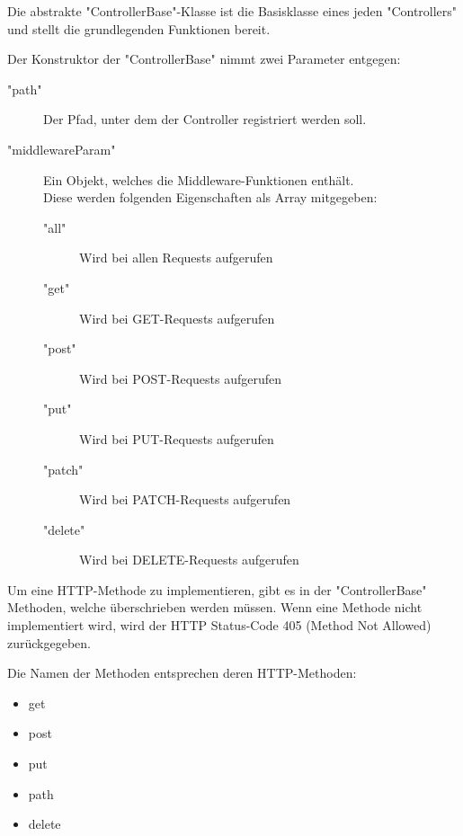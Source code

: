 
Die abstrakte "ControllerBase"-Klasse ist die Basisklasse eines jeden "Controllers" und stellt die grundlegenden Funktionen bereit. 

Der Konstruktor der "ControllerBase" nimmt zwei Parameter entgegen:

\begin{description}
    \item["path"] Der Pfad, unter dem der Controller registriert werden soll.
    \item["middlewareParam"] Ein Objekt, welches die Middleware-Funktionen enthält. \\ 
        Diese werden folgenden Eigenschaften als Array mitgegeben:
        \begin{description}
            \item["all"] Wird bei allen Requests aufgerufen
            \item["get"] Wird bei GET-Requests aufgerufen
            \item["post"] Wird bei POST-Requests aufgerufen
            \item["put"] Wird bei PUT-Requests aufgerufen
            \item["patch"] Wird bei PATCH-Requests aufgerufen
            \item["delete"] Wird bei DELETE-Requests aufgerufen
        \end{description}
\end{description}

Um eine HTTP-Methode zu implementieren, gibt es in der "ControllerBase" Methoden, welche überschrieben werden müssen. Wenn eine Methode nicht implementiert wird, wird der HTTP Status-Code 405 (Method Not Allowed) zurückgegeben.

Die Namen der Methoden entsprechen deren HTTP-Methoden:
\begin{itemize}
    \item get
    \item post
    \item put
    \item path
    \item delete
\end{itemize}